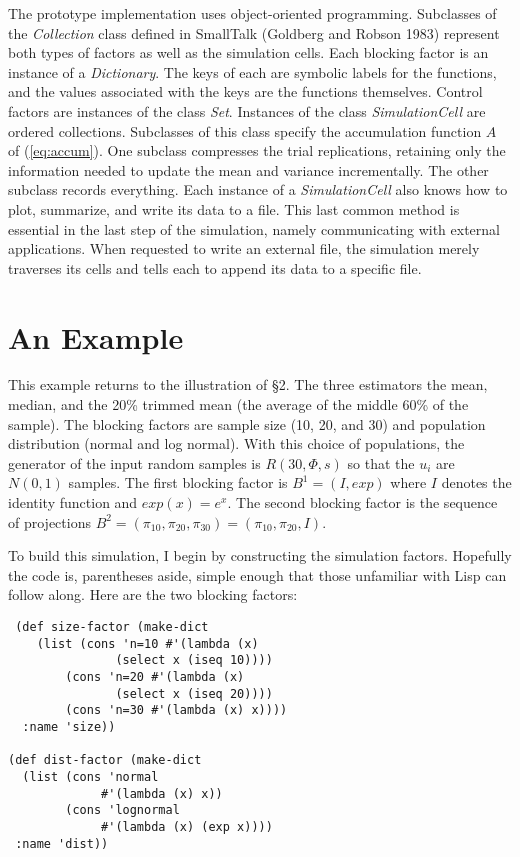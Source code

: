 The prototype implementation uses object-oriented programming. 
Subclasses of the {\it Collection} class defined in SmallTalk (Goldberg
and Robson 1983) represent both types of factors as well as the
simulation cells.  Each blocking factor is an instance of a {\it
Dictionary}.  The keys of each are symbolic labels for the functions,
and the values associated with the keys are the functions themselves.
Control factors are instances of the class {\it Set}. Instances of the
class {\it SimulationCell} are ordered collections.  Subclasses
of this class specify the accumulation function $A$ of
(\ref{eq:accum}).  One subclass compresses the trial replications,
retaining only the information needed to update the mean and variance
incrementally.  The other subclass records everything.  Each instance
of a {\it SimulationCell} also knows how to plot, summarize, and write
its data to a file.  This last common method is essential in the last
step of the simulation, namely communicating with external
applications.  When requested to write an external file, the simulation
merely traverses its cells and tells each to append its data to a
specific file.

\section{An Example}

This example returns to the illustration of \S 2. The three
estimators the mean, median, and the 20\% trimmed mean (the average
of the middle 60\% of the sample).  The blocking factors are sample
size (10, 20, and 30) and population distribution (normal and log
normal).  With this choice of populations, the generator of the input
random samples is $R(30,\Phi,s)$ so that the $u_i$ are $N(0,1)$
samples.  The first blocking factor is $B^1 = (I, exp)$ where $I$
denotes the identity function and $exp(x) = e^x$.  The second
blocking factor is the sequence of projections $B^2 =
(\pi_{10},\pi_{20}, \pi_{30}) = (\pi_{10},\pi_{20}, I)$.

To build this simulation, I begin by constructing the simulation
factors.   Hopefully the code is, parentheses aside, simple enough that
those unfamiliar with Lisp can follow along.  Here are the two
blocking factors:
\begin{verbatim}
 (def size-factor (make-dict
 	(list (cons 'n=10 #'(lambda (x)
               (select x (iseq 10))))
        (cons 'n=20 #'(lambda (x)
               (select x (iseq 20))))
        (cons 'n=30 #'(lambda (x) x))))
  :name 'size))

(def dist-factor (make-dict
  (list (cons 'normal
             #'(lambda (x) x))
        (cons 'lognormal
             #'(lambda (x) (exp x))))
 :name 'dist))
\end{verbatim}

